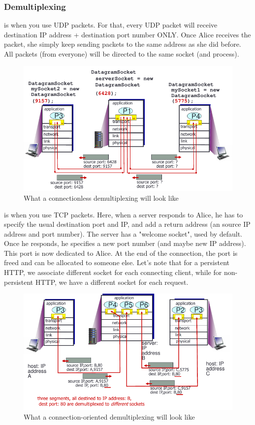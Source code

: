 \documentclass[12pt,a4paper]{article}
\begin{document}
\subsubsection{Demultiplexing}
 is when you use UDP packets. For that, every UDP packet will receive destination IP address + destination port number ONLY. Once Alice receives the packet, she simply keep sending packets to the same address as she did before. All packets (from everyone) will be directed to the same socket (and process). 

\begin{figure}[h]
	\centering
	\includegraphics[scale=0.5]{images/exemple_header_demultiplexing}
	\caption{What a connectionless demultiplexing will look like}
	\label{fig: header_demu}
\end{figure}

 is when you use TCP packets. Here, when a server responds to Alice, he has to specify the usual destination port and IP, and add a return address (an source IP address and port number). The server has a "welcome socket", used by default. Once he responds, he specifies a new port number (and maybe new IP address). This port is now dedicated to Alice. At the end of the connection, the port is freed and can be allocated to someone else. Let's note that for a persistent HTTP, we associate different socket for each connecting client, while for non-persistent HTTP, we have a different socket for each request.

\begin{figure}[!h]
	\centering
	\includegraphics[scale=0.6]{images/tcp_demu}
	\caption{What a connection-oriented demultiplexing will look like}
	\label{fig: tcp_demu}
\end{figure}
\end{document}
